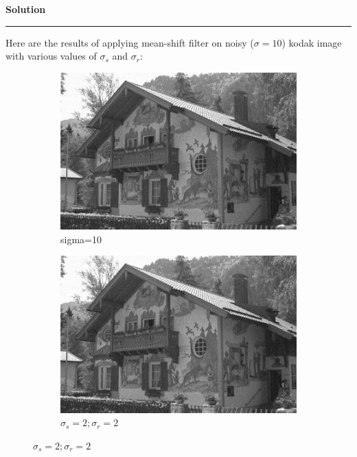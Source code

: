 \documentclass[a4paper]{article}
\newenvironment{solution}[2][]{%
    \begin{mdframed}[linecolor=green!60!black, linewidth=2pt, roundcorner=10pt, backgroundcolor=green!5!white, skipabove=12pt, skipbelow=12pt]%
        \textbf{\large #2} %
        \par\noindent\rule{\textwidth}{0.4pt} %
        \vspace{0.5em} %
}{%
    \end{mdframed}%
}
\begin{document}
\begin{solution}{Solution}
Here are the results of applying mean-shift filter on noisy ($\sigma = 10$) kodak image with various values of $\sigma_s$ and $\sigma_r$:

\begin{figure}[H]
    \centering
    \begin{subfigure}[b]{0.24\textwidth}
        \centering
        \includegraphics[width=\textwidth]{../images/noisy_kodak24_sigma_10.png}
        \caption{sigma=10}
        \label{Noisy }
    \end{subfigure}
    \begin{subfigure}[b]{0.24\textwidth}
        \centering
        \includegraphics[width=\textwidth]{../images/filtered_kodak24_meanshift_sigma_10_sigma_s_2_sigma_r_2.png}
        \caption{$\sigma_s=2;\sigma_r=2$}
        \label{fig:subfig2}
    \end{subfigure}

\end{figure}
\end{solution}
\end{document}
